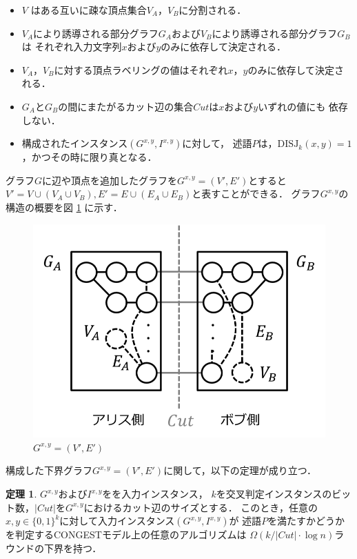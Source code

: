 \documentclass[12pt]{thesis}
\newcommand{\CONGEST}{\textsf{CONGEST}}
\theoremstyle{definition}
\newtheorem{theorem}{定理}[chapter]
\begin{document}
\begin{itemize}
\item $V$ はある互いに疎な頂点集合$V_A$，$V_B$に分割される．
\item $V_A$により誘導される部分グラフ$G_A$および$V_B$により誘導される部分グラフ$G_B$は
それぞれ入力文字列$x$および$y$のみに依存して決定される．
\item $V_A$，$V_B$に対する頂点ラベリングの値はそれぞれ$x$，$y$のみに依存して決定される．
\item $G_A$と$G_B$の間にまたがるカット辺の集合$\mathit{Cut}$は$x$および$y$いずれの値にも
依存しない．
\item 構成されたインスタンス$(G^{x,y}, I^{x,y})$に対して，
述語$P$は，$\mathrm{DISJ}_{k} (x, y)=1$，かつその時に限り真となる．
\end{itemize}
グラフ$G$に辺や頂点を追加したグラフを$G^{x, y} = (V', E')$とすると
$V' = V \cup (V_{A} \cup V_{B}), E' = E \cup (E_{A} \cup E_{B})$と表すことができる．
グラフ$G^{x, y}$の構造の概要を図 \ref{Gxy} に示す．
\begin{figure}[ht]
\begin{center}
\includegraphics[width=120mm]{Gxy.png}
\end{center}
\caption{$G^{x, y} = (V', E')$}
\label{Gxy}
\end{figure}
構成した下界グラフ$G^{x, y} = (V', E')$に関して，以下の定理が成り立つ．
\begin{theorem}
$G^{x,y}$および$I^{x,y}$をを入力インスタンス，
$k$を交叉判定インスタンスのビット数，$|\mathit{Cut}|$を$G^{x, y}$におけるカット辺のサイズとする．
このとき，任意の$x, y \in \{0, 1\}^k$に対して入力インスタンス$(G^{x, y}, I^{x,y})$が
述語$P$を満たすかどうかを判定する{\CONGEST}モデル上の任意のアルゴリズムは
$\Omega (k / |\mathit{Cut}| \cdot \log n)$ラウンドの下界を持つ．
\label{lower}
\end{theorem}
\end{document}
